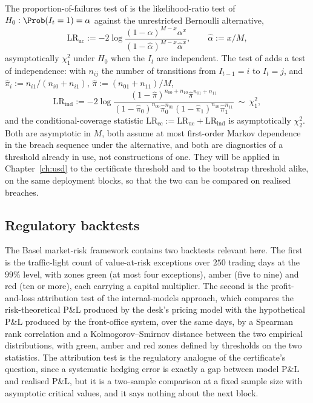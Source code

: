 The proportion-of-failures test of \cite{kupiec1995} is the likelihood-ratio test of $H_0:\Prob(I_t=1)=\alpha$ against the unrestricted Bernoulli alternative,
\[
\mathrm{LR}_{\mathrm{uc}}:=-2\log\frac{(1-\alpha)^{M-x}\alpha^{x}}{(1-\hat\alpha)^{M-x}\hat\alpha^{x}},\qquad\hat\alpha:=x/M ,
\]
asymptotically $\chi^2_1$ under $H_0$ when the $I_t$ are independent. The test of \cite{christoffersen1998} adds a test of independence: with $n_{ij}$ the number of transitions from $I_{t-1}=i$ to $I_t=j$, and $\hat\pi_i:=n_{i1}/(n_{i0}+n_{i1})$, $\hat\pi:=(n_{01}+n_{11})/M$,
\[
\mathrm{LR}_{\mathrm{ind}}:=-2\log\frac{(1-\hat\pi)^{n_{00}+n_{10}}\hat\pi^{n_{01}+n_{11}}}{(1-\hat\pi_0)^{n_{00}}\hat\pi_0^{n_{01}}(1-\hat\pi_1)^{n_{10}}\hat\pi_1^{n_{11}}}\ \sim\ \chi^2_1 ,
\]
and the conditional-coverage statistic $\mathrm{LR}_{\mathrm{cc}}:=\mathrm{LR}_{\mathrm{uc}}+\mathrm{LR}_{\mathrm{ind}}$ is asymptotically $\chi^2_2$. Both are asymptotic in $M$, both assume at most first-order Markov dependence in the breach sequence under the alternative, and both are diagnostics of a threshold already in use, not constructions of one. They will be applied in Chapter~\ref{ch:usd} to the certificate threshold and to the bootstrap threshold alike, on the same deployment blocks, so that the two can be compared on realised breaches.

\subsection{Regulatory backtests}

The Basel market-risk framework \cite{bcbs2019} contains two backtests relevant here. The first is the traffic-light count of value-at-risk exceptions over $250$ trading days at the $99\%$ level, with zones green (at most four exceptions), amber (five to nine) and red (ten or more), each carrying a capital multiplier. The second is the profit-and-loss attribution test of the internal-models approach, which compares the risk-theoretical P\&L produced by the desk's pricing model with the hypothetical P\&L produced by the front-office system, over the same days, by a Spearman rank correlation and a Kolmogorov--Smirnov distance between the two empirical distributions, with green, amber and red zones defined by thresholds on the two statistics. The attribution test is the regulatory analogue of the certificate's question, since a systematic hedging error is exactly a gap between model P\&L and realised P\&L, but it is a two-sample comparison at a fixed sample size with asymptotic critical values, and it says nothing about the next block.

